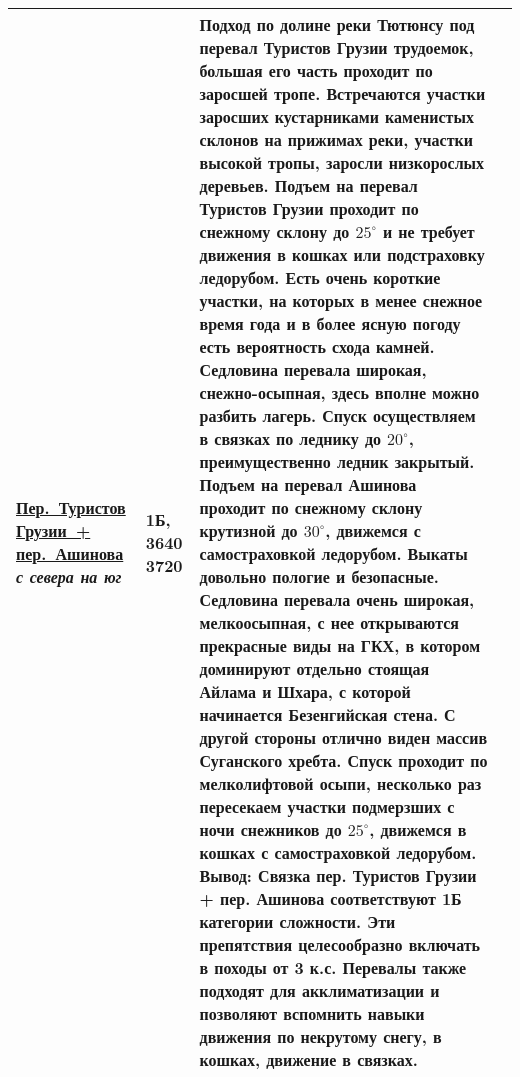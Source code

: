 {\begin{longtable}{|>{\centering\arraybackslash}m{3.8cm}|>{\centering\arraybackslash}m{1.3cm}|>{\raggedright\arraybackslash}m{11.5cm}|>{\centering\arraybackslash}m{1cm}|}
		 	\hyperref[subsec:Day4]{Пер.~Туристов Грузии~+ пер.~Ашинова}											\newline\textit{с севера на юг}			&	1Б, 3640 3720				&	Подход по долине реки Тютюнсу под перевал Туристов Грузии трудоемок, большая его часть проходит по заросшей тропе. Встречаются участки заросших кустарниками каменистых склонов на прижимах реки, участки высокой тропы, заросли низкорослых деревьев. Подъем на перевал Туристов Грузии проходит по снежному склону до $25^\circ$ и не требует движения в кошках или подстраховку ледорубом. Есть очень короткие участки, на которых в менее снежное время года и в более ясную погоду есть вероятность схода камней. Седловина перевала широкая, снежно-осыпная, здесь вполне можно разбить лагерь. Спуск осуществляем в связках по леднику до $20^\circ$, преимущественно ледник закрытый. Подъем на перевал Ашинова проходит по снежному склону крутизной до $30^\circ$, движемся с самостраховкой ледорубом. Выкаты довольно пологие и безопасные. Седловина перевала очень широкая, мелкоосыпная, с нее открываются прекрасные виды на ГКХ, в котором доминируют отдельно стоящая Айлама и Шхара, с которой начинается Безенгийская стена. С другой стороны отлично виден массив Суганского хребта. Спуск проходит по мелколифтовой осыпи, несколько раз пересекаем участки подмерзших с ночи снежников до $25^\circ$, движемся в кошках с самостраховкой ледорубом. \newline	\textbf{Вывод:} Связка пер. Туристов Грузии + пер. Ашинова соответствуют 1Б категории сложности. Эти препятствия целесообразно включать в походы от 3 к.с. Перевалы также подходят для акклиматизации и позволяют вспомнить навыки движения по некрутому снегу, в кошках, движение в связках.																																																																																																																					&			\\ \hline

\end{longtable}}
